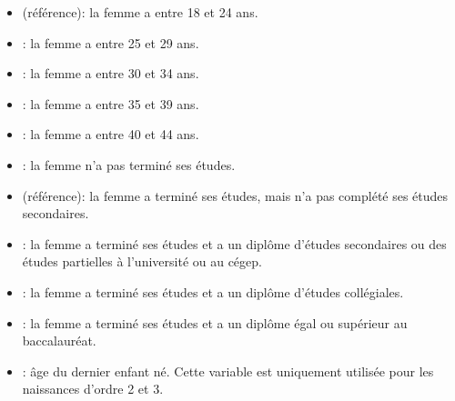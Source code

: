 \documentclass[letterpaper,10pt,french]{sphinxmanual}
\begin{document}
\begin{itemize}
\item {} 
 (référence): la femme a entre 18 et 24 ans.

\item {} 
: la femme a entre 25 et 29 ans.

\item {} 
: la femme a entre 30 et 34 ans.

\item {} 
: la femme a entre 35 et 39 ans.

\item {} 
: la femme a entre 40 et 44 ans.

\end{itemize}

\begin{itemize}
\item {} 
: la femme n’a pas terminé ses études.

\item {} 
 (référence): la femme a terminé ses études, mais n’a pas complété ses études secondaires.

\item {} 
: la femme a terminé ses études et a un diplôme d’études secondaires ou des études partielles à l’université ou au cégep.

\item {} 
: la femme a terminé ses études et a un diplôme d’études collégiales.

\item {} 
: la femme a terminé ses études et a un diplôme égal ou supérieur au baccalauréat.

\end{itemize}

\begin{itemize}
\item {} 
: âge du dernier enfant né. Cette variable est uniquement utilisée pour les naissances d’ordre 2 et 3.

\end{itemize}
\end{document}

